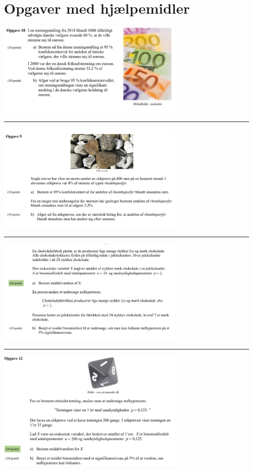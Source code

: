 \section*{Opgaver med hjælpemidler}
\begin{center}
	\includegraphics[width=0.7\textwidth]{Billeder/eksamensopgstat/opg1m}
	\hrule
	\includegraphics[width=0.7\textwidth]{Billeder/eksamensopgstat/opg2m}
	\hrule
	\includegraphics[width=0.7\textwidth]{Billeder/eksamensopgstat/opg3m}
	\hrule
	\includegraphics[width=0.7\textwidth]{Billeder/eksamensopgstat/opg4m}

\end{center}
